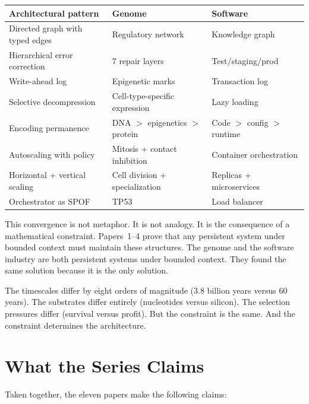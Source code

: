 \documentclass[11pt]{article}
\theoremstyle{definition}
\begin{document}
\begin{center}
\small
\begin{tabular}{lll}
\toprule
\textbf{Architectural pattern} & \textbf{Genome} & \textbf{Software} \\
\midrule
Directed graph with typed edges & Regulatory network & Knowledge graph \\
Hierarchical error correction & 7 repair layers & Test/staging/prod \\
Write-ahead log & Epigenetic marks & Transaction log \\
Selective decompression & Cell-type-specific expression & Lazy loading \\
Encoding permanence & DNA $>$ epigenetics $>$ protein & Code $>$ config $>$ runtime \\
Autoscaling with policy & Mitosis + contact inhibition & Container orchestration \\
Horizontal + vertical scaling & Cell division + specialization & Replicas + microservices \\
Orchestrator as SPOF & TP53 & Load balancer \\
\bottomrule
\end{tabular}
\end{center}

This convergence is not metaphor. It is not analogy. It is the
consequence of a mathematical constraint. Papers~1--4 prove that
any persistent system under bounded context must maintain these
structures. The genome and the software industry are both persistent
systems under bounded context. They found the same solution because
it is the only solution.

The timescales differ by eight orders of magnitude (3.8 billion years
versus 60 years). The substrates differ entirely (nucleotides versus
silicon). The selection pressures differ (survival versus profit).
But the constraint is the same. And the constraint determines the
architecture.

\section{What the Series Claims}
\label{sec:claims}

Taken together, the eleven papers make the following claims:
\end{document}
